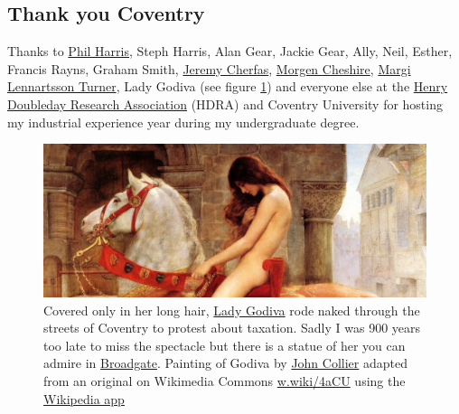 \documentclass[
]{book}
\begin{document}
\hypertarget{coventry}{%
\subsection{Thank you Coventry}\label{coventry}}

Thanks to \href{https://www.coventry.ac.uk/research/research-people/professor-phil-harris/}{Phil Harris}, Steph Harris, Alan Gear, Jackie Gear, Ally, Neil, Esther, Francis Rayns, Graham Smith, \href{https://www.jeremycherfas.net/}{Jeremy Cherfas}, \href{https://cheshirenonprofitlaw.com/people/team/morgen/}{Morgen Cheshire}, \href{https://pureportal.coventry.ac.uk/en/persons/margi-lennartsson-turner}{Margi Lennartsson Turner}, Lady Godiva (see figure \ref{fig:coventry-fig}) and everyone else at the \href{https://en.wikipedia.org/wiki/Henry_Doubleday_Research_Association}{Henry Doubleday Research Association} (HDRA) and Coventry University for hosting my industrial experience year during my undergraduate degree.

\begin{figure}

{\centering \includegraphics[width=1\linewidth]{images/godiva} 

}

\caption{Covered only in her long hair, \href{https://en.wikipedia.org/wiki/Lady_Godiva}{Lady Godiva} rode naked through the streets of Coventry to protest about taxation. Sadly I was 900 years too late to miss the spectacle but there is a statue of her you can admire in \href{https://www.historiccoventry.co.uk/broadgate/broadgate.php?pg=broadgate3}{Broadgate}. Painting of Godiva by \href{https://en.wikipedia.org/wiki/John_Collier_(painter)}{John Collier} adapted from an original on Wikimedia Commons \href{https://w.wiki/4aCU}{w.wiki/4aCU} using the \href{https://apps.apple.com/us/app/wikipedia/id324715238}{Wikipedia app}}\label{fig:coventry-fig}
\end{figure}
\end{document}
